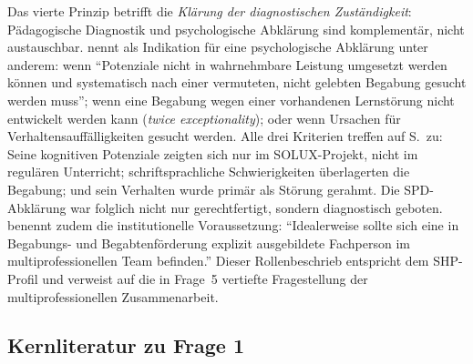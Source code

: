 \documentclass[ngerman, a4paper]{article}
\begin{document}
Das vierte Prinzip betrifft die \textit{Klärung der diagnostischen
Zuständigkeit}: Pädagogische Diagnostik und psychologische Abklärung
sind komplementär, nicht austauschbar.
\textcite[S.\,235--236]{muelleroppliger2021paeddiagnostik} nennt als
Indikation für eine psychologische Abklärung unter anderem: wenn
\enquote{Potenziale nicht in wahrnehmbare Leistung umgesetzt werden
können und systematisch nach einer vermuteten, nicht gelebten Begabung
gesucht werden muss}; wenn eine Begabung wegen einer vorhandenen
Lernstörung nicht entwickelt werden kann (\textit{twice exceptionality});
oder wenn Ursachen für Verhaltensauffälligkeiten gesucht werden. Alle
drei Kriterien treffen auf S.\ zu: Seine kognitiven Potenziale zeigten
sich nur im SOLUX-Projekt, nicht im regulären Unterricht;
schriftsprachliche Schwierigkeiten überlagerten die Begabung; und sein
Verhalten wurde primär als Störung gerahmt. Die SPD-Abklärung war
folglich nicht nur gerechtfertigt, sondern diagnostisch geboten.
\textcite[S.\,230]{muelleroppliger2021paeddiagnostik} benennt zudem die
institutionelle Voraussetzung: \enquote{Idealerweise sollte sich eine in
Begabungs- und Begabtenförderung explizit ausgebildete Fachperson im
multiprofessionellen Team befinden.} Dieser Rollenbeschrieb entspricht
dem SHP-Profil und verweist auf die in Frage~5 vertiefte Fragestellung
der multiprofessionellen Zusammenarbeit.
 
\subsection{Kernliteratur zu Frage 1}
 
\end{document}
